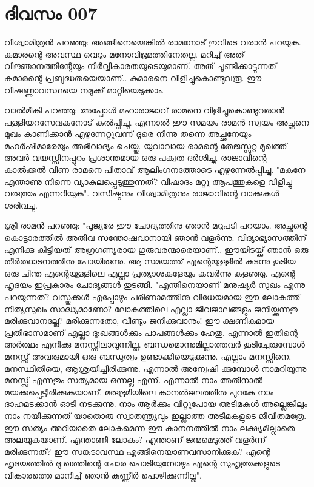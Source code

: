 \newpage
\section{ദിവസം 007}


വിശ്വാമിത്രന്‍ പറഞ്ഞു: അങ്ങിനെയെങ്കില്‍ രാമനോട്‌ ഇവിടെ വരാന്‍ പറയുക. കുമാരന്റെ അവസ്ഥ വെറും മനോവിഭ്രമത്തിനേതല്ല. മറിച്ച്‌ അത്‌ വിജ്ഞാനത്തിന്റേയും നിര്‍വ്വികാരതയുടെയുമാണ്‌. അത്‌ ചൂണ്ടിക്കാട്ടുന്നത്‌ കുമാരന്റെ പ്രബുദ്ധതയെയാണ്‌.. കുമാരനെ വിളിച്ചുകൊണ്ടുവരൂ. ഈ വിഷണ്ണാവസ്ഥയെ നമുക്ക്‌ മാറ്റിയെടുക്കാം.

വാല്‍മീകി പറഞ്ഞു: അപ്പോള്‍ മഹാരാജാവ്‌ രാമനെ വിളിച്ചുകൊണ്ടുവരാന്‍ പള്ളിയറസേവകനോട്‌ കല്‍പ്പിച്ചു. എന്നാല്‍ ഈ സമയം രാമന്‍ സ്വയം അച്ഛനെ മുഖം കാണിക്കാന്‍ എഴുന്നേറ്റുവന്ന് ദൂരെ നിന്നു തന്നെ അച്ഛനേയും മഹര്‍ഷിമാരേയും അഭിവാദ്യം ചെയ്തു. യുവാവായ രാമന്റെ തേജസ്സുറ്റ മുഖത്ത്‌ അവര്‍ വയസ്സിനപ്പുറം പ്രശാന്തമായ ഒരു പക്വത ദര്‍ശിച്ചു. രാജാവിന്റെ കാല്‍ക്കല്‍ വീണ രാമനെ പിതാവ്‌ ആലിംഗനത്തോടെ എഴുന്നേല്‍പ്പിച്ചു. "മകനേ എന്താണു നിന്നെ വ്യാകുലപ്പെടുത്തുന്നത്‌? വിഷാദം മറ്റു ആപത്തുകളെ വിളിച്ചു വരുത്തും എന്നറിയുക". വസിഷ്ഠനും വിശ്വാമിത്രനും രാജാവിന്റെ വാക്കുകള്‍ ശരിവച്ചു.

ശ്രീ രാമന്‍ പറഞ്ഞു: "പൂജ്യരേ ഈ ചോദ്യത്തിനു ഞാന്‍ മറുപടി പറയാം. അച്ഛന്റെ കൊട്ടാരത്തില്‍ അതീവ സന്തോഷവാനായി ഞാന്‍ വളര്‍ന്നു. വിദ്യാഭ്യാസത്തിന്‌ എനിക്കു കിട്ടിയത്‌ അഗ്രഗണ്യരായ ഗുരുവരന്മാരെയാണ്‌.. ഈയിടയ്ക്ക്‌ ഞാന്‍ ഒരു തീര്‍ത്ഥാടനത്തിനു പോയിരുന്നു. ആ സമയത്ത്‌ എന്റെയുള്ളില്‍ കടന്നു കൂടിയ ഒരു ചിന്ത എന്റെയുള്ളിലെ എല്ലാ പ്രത്യാശകളേയും കവര്‍ന്നു കളഞ്ഞു. എന്റെ ഹൃദയം ഇപ്രകാരം ചോദ്യങ്ങള്‍ തുടങ്ങി. "എന്തിനെയാണ്‌ മനുഷ്യര്‍ സുഖം എന്നു പറയുന്നത്‌? വസ്തുക്കള്‍ എപ്പോഴും പരിണാമത്തിനു വിധേയമായ ഈ ലോകത്ത്‌ നിത്യസുഖം സാദ്ധ്യമാണോ? ലോകത്തിലെ എല്ലാ ജീവജാലങ്ങളും ജനിയ്ക്കുന്നതു മരിക്കുവാനല്ലേ? മരിക്കുന്നതോ, വീണ്ടും ജനിക്കുവാനും! ഈ ക്ഷണികമായ പ്രതിഭാസമാണ്‌ എല്ലാ ദു:ഖങ്ങള്‍ക്കും പാപങ്ങള്‍ക്കും ഹേതു. എന്നാല്‍ ഇതിന്റെ അര്‍ത്ഥം എനിക്കു മനസ്സിലാവുന്നില്ല. ബന്ധമൊന്നുമില്ലാത്തവര്‍ കൂടിച്ചേരുമ്പോള്‍ മനസ്സ്‌ അവരുമായി ഒരു ബന്ധുത്വം ഉണ്ടാക്കിയെടുക്കുന്നു. എല്ലാം മനസ്സിനെ, മനസ്ഥിതിയെ, ആശ്രയിച്ചിരിക്കുന്നു. എന്നാല്‍ അന്വേഷി ക്കുമ്പോള്‍ നാമറിയുന്നു മനസ്സ്‌ എന്നതും സത്യമായ ഒന്നല്ല എന്ന്. എന്നാല്‍ നാം അതിനാല്‍ മയക്കപ്പെട്ടിരിക്കുകയാണ്‌. മരുഭൂമിയിലെ കാനല്‍ജലത്തിനു പുറകേ നാം ദാഹമടക്കാന്‍ ഓടി നടക്കുന്നു. നാം ആര്‍ക്കും വിറ്റുപോയ അടിമകള്‍ അല്ലെങ്കിലും നാം നയിക്കുന്നത്‌ യാതൊരു സ്വാതന്ത്ര്യവും ഇല്ലാത്ത അടിമകളുടെ ജീവിതമത്രേ. ഈ സത്യം അറിയാതെ ലോകമെന്ന ഈ കാനനത്തില്‍ നാം ലക്ഷ്യമില്ലാതെ അലയുകയാണ്‌. എന്താണീ ലോകം? എന്താണ്‌ ജന്മമെടുത്ത്‌ വളര്‍ന്ന് മരിക്കുന്നത്‌? ഈ സങ്കടാവസ്ഥ എങ്ങിനെയാണവസാനിക്കുക? എന്റെ ഹൃദയത്തില്‍ ദു:ഖത്തിന്റെ ചോര പൊടിയുമ്പോഴും എന്റെ സുഹൃത്തുക്കളുടെ വികാരത്തെ മാനിച്ച്‌ ഞാന്‍ കണ്ണീര്‍ പൊഴിക്കുന്നില്ല".
